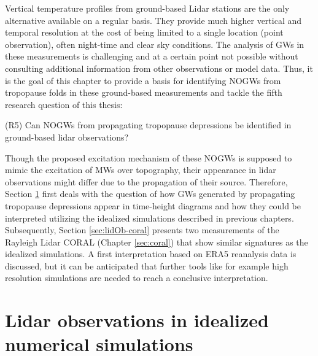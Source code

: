 Vertical temperature profiles from ground-based Lidar stations are the only alternative available on a regular basis. They provide much higher vertical and temporal resolution at the cost of being limited to a single location (point observation), often night-time and clear sky conditions. The analysis of GWs in these measurements is challenging and at a certain point not possible without consulting additional information from other observations or model data. Thus, it is the goal of this chapter to provide a basis for identifying NOGWs from tropopause folds in these ground-based measurements and tackle the fifth research question of this thesis:
%
\begin{tcolorbox}[]
    (R5) Can NOGWs from propagating tropopause depressions be identified in ground-based lidar observations?
\end{tcolorbox}
Though the proposed excitation mechanism of these NOGWs is supposed to mimic the excitation of MWs over topography, their appearance in lidar observations might differ due to the propagation of their source. Therefore, Section \ref{sec:lidOb-idealized} first deals with the question of how GWs generated by propagating tropopause depressions appear in time-height diagrams and how they could be interpreted utilizing the idealized simulations described in previous chapters.
Subsequently, Section \ref{sec:lidOb-coral} presents two measurements of the Rayleigh Lidar CORAL (Chapter \ref{sec:coral}) that show similar signatures as the idealized simulations. A first interpretation based on ERA5 reanalysis data is discussed, but it can be anticipated that further tools like for example high resolution simulations are needed to reach a conclusive interpretation. 

\section{Lidar observations in idealized numerical simulations}
\label{sec:lidOb-idealized}


